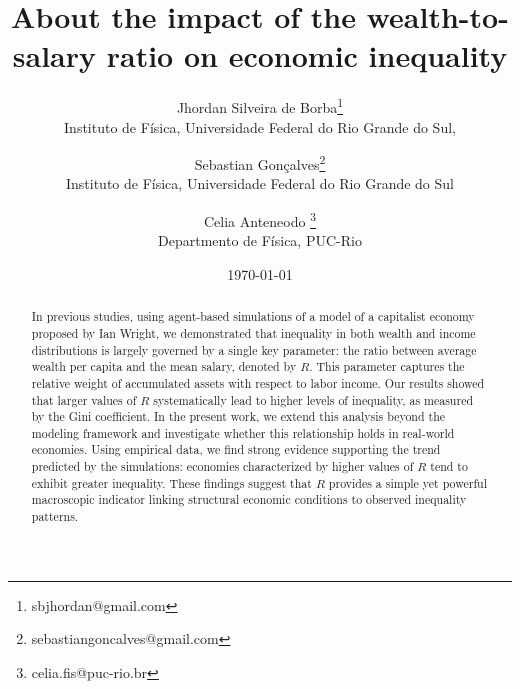 \documentclass[12pt]{article}
\begin{document}
\title{About the impact of the wealth-to-salary  ratio on economic inequality
}
\author{
Jhordan Silveira de Borba\thanks{sbjhordan@gmail.com}\\
Instituto de Física, Universidade Federal do Rio Grande do Sul,%
\and
Sebastian Gonçalves\thanks{sebastiangoncalves@gmail.com}\\
Instituto de Física, Universidade Federal do Rio Grande do Sul%
\and
Celia Anteneodo \thanks{celia.fis@puc-rio.br}\\
Departmento de Física, PUC-Rio%
}


\date{\today}


\maketitle

\begin{abstract} 

In previous studies, using agent-based simulations of a model of a capitalist economy proposed by Ian Wright, we demonstrated that inequality in both wealth and income distributions is largely governed by a single key parameter: the ratio between average wealth per capita and the mean salary, denoted by $R$. This parameter captures the relative weight of accumulated assets with respect to labor income. Our results showed that larger values of $R$
systematically lead to higher levels of inequality, as measured by the Gini coefficient.
%
In the present work, we extend this analysis beyond the modeling framework and investigate whether this relationship holds in real-world economies. Using empirical data, we find strong evidence supporting the trend predicted by the simulations: economies characterized by higher values of $R$ tend to exhibit greater inequality. These findings suggest that $R$ provides a simple yet powerful macroscopic indicator linking structural economic conditions to observed inequality patterns.

\end{abstract}
\end{document}
